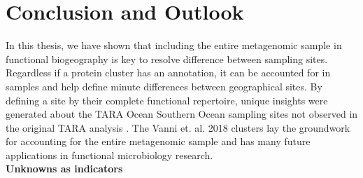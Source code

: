 

\chapter{Conclusion and Outlook} %

\label{Conclusion and Outlook} %


\renewcommand{\chaptermark}[1]{\markboth{#1}{}}
\renewcommand{\sectionmark}[1]{\markright{#1}}
\fancyhead[RE]{\small\leftmark}
\fancyhead[LO]{\small\rightmark}%


In this thesis, we have shown that including the entire metagenomic sample in functional biogeography is key to resolve difference between sampling sites. Regardless if a protein cluster has an annotation, it can be accounted for in samples and help define minute differences between geographical sites. By defining a site by their complete functional repertoire, unique insights were generated about the TARA Ocean Southern Ocean sampling sites not observed in the original TARA analysis \citep{Sunagawa_2015}. The Vanni et. al. 2018 clusters lay the groundwork for accounting for the entire metagenomic sample and has many future applications in functional microbiology research.\\

\textbf{Unknowns as indicators}\\


